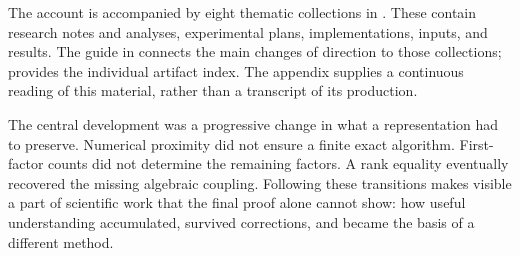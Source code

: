 \documentclass[11pt,a4paper]{article}
\begin{document}
The account is accompanied by eight thematic collections in
. These contain research notes and analyses,
experimental plans, implementations, inputs, and results. The guide in
 connects the main changes of direction to those
collections;  provides the individual
artifact index. The appendix supplies a continuous reading of this
material, rather than a transcript of its production.

The central development was a progressive change in what a representation
had to preserve. Numerical proximity did not ensure a finite exact
algorithm. First-factor counts did not determine the remaining factors.
A rank equality eventually recovered the missing algebraic coupling.
Following these transitions makes visible a part of scientific work that
the final proof alone cannot show: how useful understanding accumulated,
survived corrections, and became the basis of a different method.


\FloatBarrier

\FloatBarrier
\clearpage
{}
{}
\ifQiushiHasCitations
\fi
\end{document}
